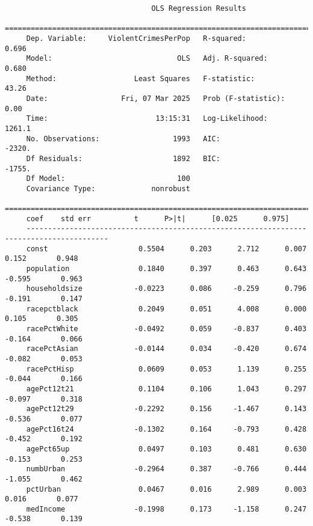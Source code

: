 \documentclass[letterpaper]{article}
\begin{document}
	\begin{minipage}{\linewidth}
	\begin{Verbatim}
                                  OLS Regression Results                            
     ===============================================================================
     Dep. Variable:     ViolentCrimesPerPop   R-squared:                       0.696
     Model:                             OLS   Adj. R-squared:                  0.680
     Method:                  Least Squares   F-statistic:                     43.26
     Date:                 Fri, 07 Mar 2025   Prob (F-statistic):               0.00
     Time:                         13:15:31   Log-Likelihood:                 1261.1
     No. Observations:                 1993   AIC:                            -2320.
     Df Residuals:                     1892   BIC:                            -1755.
     Df Model:                          100                                         
     Covariance Type:             nonrobust                                         
     =========================================================================================
     coef    std err          t      P>|t|      [0.025      0.975]
     -----------------------------------------------------------------------------------------
     const                     0.5504      0.203      2.712      0.007       0.152       0.948
     population                0.1840      0.397      0.463      0.643      -0.595       0.963
     householdsize            -0.0223      0.086     -0.259      0.796      -0.191       0.147
     racepctblack              0.2049      0.051      4.008      0.000       0.105       0.305
     racePctWhite             -0.0492      0.059     -0.837      0.403      -0.164       0.066
     racePctAsian             -0.0144      0.034     -0.420      0.674      -0.082       0.053
     racePctHisp               0.0609      0.053      1.139      0.255      -0.044       0.166
     agePct12t21               0.1104      0.106      1.043      0.297      -0.097       0.318
     agePct12t29              -0.2292      0.156     -1.467      0.143      -0.536       0.077
     agePct16t24              -0.1302      0.164     -0.793      0.428      -0.452       0.192
     agePct65up                0.0497      0.103      0.481      0.630      -0.153       0.253
     numbUrban                -0.2964      0.387     -0.766      0.444      -1.055       0.462
     pctUrban                  0.0467      0.016      2.989      0.003       0.016       0.077
     medIncome                -0.1998      0.173     -1.158      0.247      -0.538       0.139

\end{Verbatim}
\end{minipage}
\end{document}

